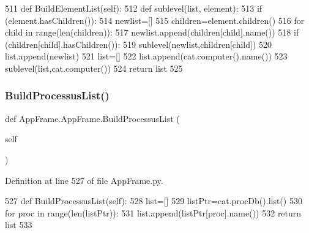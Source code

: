 \begin{DoxyCode}
511     \textcolor{keyword}{def }BuildElementList(self):
512         \textcolor{keyword}{def }sublevel(list, element):
513             \textcolor{keywordflow}{if} (element.hasChildren()):
514                 newlist=[]
515                 children=element.children()
516                 \textcolor{keywordflow}{for} child \textcolor{keywordflow}{in} range(len(children)):
517                     newlist.append(children[child].name())
518                     \textcolor{keywordflow}{if} (children[child].hasChildren()):
519                         sublevel(newlist,children[child])
520                 list.append(newlist)
521         list=[]
522         list.append(cat.computer().name())
523         sublevel(list,cat.computer())
524         \textcolor{keywordflow}{return} list
525 
\end{DoxyCode}
\mbox{\label{classAppFrame_1_1AppFrame_a56984a1e8d83849a66965ec5cb99e6e7}} 
\subsubsection{\texorpdfstring{Build\+Processus\+List()}{BuildProcessusList()}}
{\footnotesize\ttfamily def App\+Frame.\+App\+Frame.\+Build\+Processus\+List (\begin{DoxyParamCaption}\item[{}]{self }\end{DoxyParamCaption})}



Definition at line 527 of file App\+Frame.\+py.


\begin{DoxyCode}
527     \textcolor{keyword}{def }BuildProcessusList(self):
528         list=[]
529         listPtr=cat.procDb().list()
530         \textcolor{keywordflow}{for} proc \textcolor{keywordflow}{in} range(len(listPtr)):
531             list.append(listPtr[proc].name())
532         \textcolor{keywordflow}{return} list
533         
\end{DoxyCode}
\mbox{\label{classAppFrame_1_1AppFrame_a66c7d8bd4f702f36aa230cb54f47e7e8}} 
